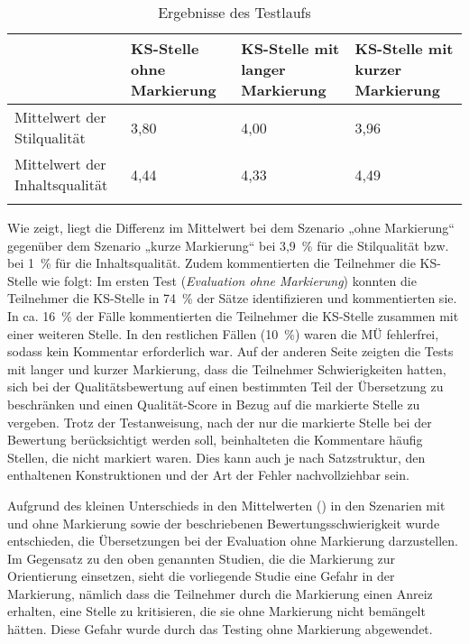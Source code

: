 \begin{table}
\begin{tabularx}{\textwidth}{QYYY}
\lsptoprule
& KS-Stelle ohne Markierung & KS-Stelle mit langer Markierung & KS-Stelle mit kurzer Markierung\\
\midrule
Mittelwert der Stilqualität & 3,80 & 4,00 & 3,96\\
\tablevspace
Mittelwert der Inhaltsqualität & 4,44 & 4,33 & 4,49\\
\lspbottomrule
\end{tabularx}
\caption{\label{tab:4:10}Ergebnisse des Testlaufs}
\end{table}

Wie  zeigt, liegt die Differenz im Mittelwert bei dem Szenario „ohne Markierung“ gegenüber dem Szenario „kurze Markierung“ bei 3,9~\% für die Stilqualität bzw. bei 1~\% für die Inhaltsqualität. Zudem kommentierten die Teilnehmer die KS-Stelle wie folgt: Im ersten Test (\textit{Evaluation ohne Markierung}) konnten die Teilnehmer die KS-Stelle in 74~\% der Sätze identifizieren und kommentierten sie. In ca. 16~\% der Fälle kommentierten die Teilnehmer die KS-Stelle zusammen mit einer weiteren Stelle. In den restlichen Fällen (10~\%) waren die MÜ fehlerfrei, sodass kein Kommentar erforderlich war. Auf der anderen Seite zeigten die Tests mit langer und kurzer Markierung, dass die Teilnehmer Schwierigkeiten hatten, sich bei der Qualitätsbewertung auf einen bestimmten Teil der Übersetzung zu beschränken und einen Qualität-Score in Bezug auf die markierte Stelle zu vergeben. Trotz der Testanweisung, nach der nur die markierte Stelle bei der Bewertung berücksichtigt werden soll, beinhalteten die Kommentare häufig Stellen, die nicht markiert waren. Dies kann auch je nach Satzstruktur, den enthaltenen Konstruktionen und der Art der Fehler nachvollziehbar sein.

Aufgrund des kleinen Unterschieds in den Mittelwerten () in den Szenarien mit und ohne Markierung sowie der beschriebenen Bewertungsschwierigkeit wurde entschieden, die Übersetzungen bei der Evaluation ohne Markierung darzustellen. Im Gegensatz zu den oben genannten Studien, die die Markierung zur Orientierung einsetzen, sieht die vorliegende Studie eine Gefahr in der Markierung, nämlich dass die Teilnehmer durch die Markierung einen Anreiz erhalten, eine Stelle zu kritisieren, die sie ohne Markierung nicht bemängelt hätten. Diese Gefahr wurde durch das Testing ohne Markierung abgewendet.


